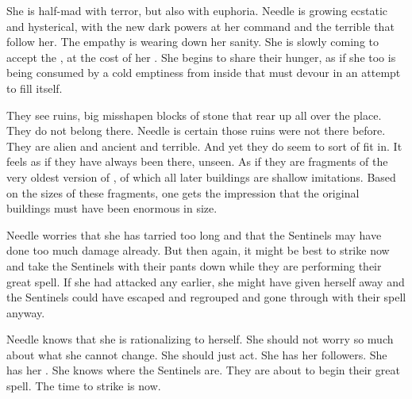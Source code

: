 She is half-mad with terror, but also with euphoria. 
Needle is growing ecstatic and hysterical, with the new dark powers at her command and the terrible \banes that follow her.
The \bane empathy is wearing down her sanity. 
She is slowly coming to accept the \banes, at the cost of her \humanity. 
She begins to share their hunger, as if she too is being consumed by a cold emptiness from inside that must devour in an attempt to fill itself. 


They see ruins, big misshapen blocks of stone that rear up all over the place. 
They do not belong there. 
Needle is certain those ruins were not there before. 
They are alien and ancient and terrible.
And yet they do seem to sort of fit in.
It feels as if they have always been there, unseen.
As if they are fragments of the very oldest version of \Malcur, of which all later buildings are shallow imitations. 
Based on the sizes of these fragments, one gets the impression that the original buildings must have been enormous in size.

Needle worries that she has tarried too long and that the Sentinels may have done too much damage already.
But then again, it might be best to strike now and take the Sentinels with their pants down while they are performing their great spell.
If she had attacked any earlier, she might have given herself away and the Sentinels could have escaped and regrouped and gone through with their spell anyway. 

Needle knows that she is rationalizing to herself. 
She should not worry so much about what she cannot change. 
She should just act.
She has her followers.
She has her \banes. 
She knows where the Sentinels are.
They are about to begin their great spell. 
The time to strike is now. 

